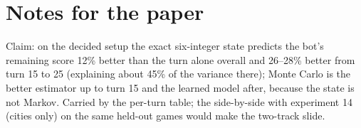 \documentclass{../polyexp}
\begin{document}
\section{Notes for the paper}
Claim: on the decided setup the exact six-integer state predicts the bot's remaining score 12\% better than the turn
alone overall and 26--28\% better from turn 15 to 25 (explaining about 45\% of the variance there); Monte Carlo is
the better estimator up to turn 15 and the learned model after, because the state is not Markov. Carried by the
per-turn table; the side-by-side with experiment 14 (cities only) on the same held-out games would make the
two-track slide.

\end{document}
